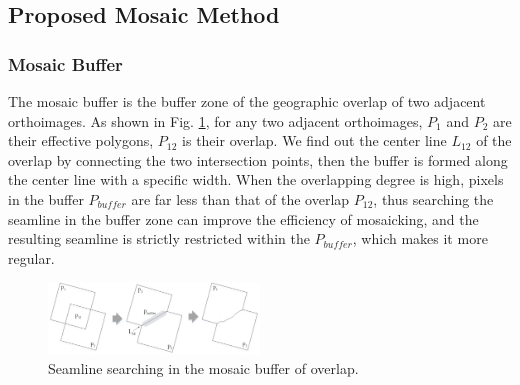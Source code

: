 \documentclass[journal]{IEEEtran}
\begin{document}
\subsection{Proposed Mosaic Method}
\subsubsection{Mosaic Buffer}
The mosaic buffer is the buffer zone of the geographic overlap of two adjacent orthoimages. As shown in Fig. \ref{fig:buffer}, for any two adjacent orthoimages, $P_1$ and $P_2$ are their effective polygons, $P_{12}$ is their overlap. We find out the center line $L_{12}$ of the overlap by connecting the two intersection points, then the buffer is formed along the center line with a specific width. When the overlapping degree is high, pixels in the buffer $P_{buffer}$ are far less than that of the overlap $P_{12}$, thus searching the seamline in the buffer zone can improve the efficiency of mosaicking, and the resulting seamline is strictly restricted within the $P_{buffer}$, which makes it more regular.
\begin{figure}[!t]
	\centering
	\includegraphics[width=0.5\textwidth]{buffer}
	\caption{Seamline searching in the mosaic buffer of overlap.}
	\label{fig:buffer}
\end{figure}
\end{document}
